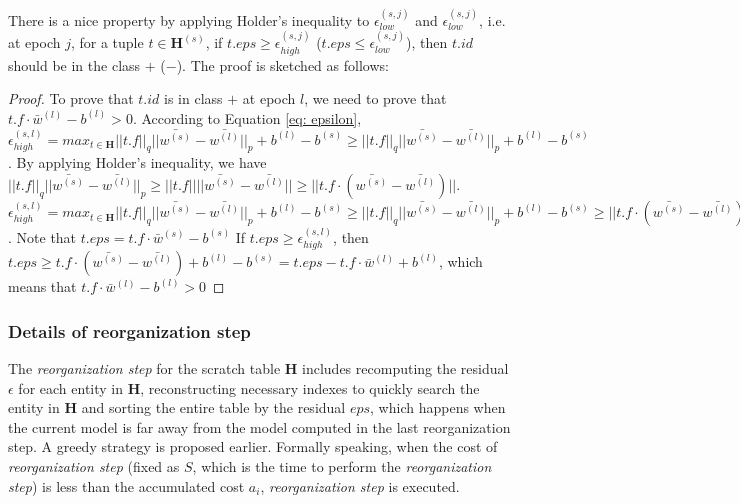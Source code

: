 There is a nice property by applying Holder's inequality \cite{rudin1976principles} to $\epsilon_{low}^{(s,j)}$ and $\epsilon_{low}^{(s,j)}$, i.e. at epoch $j$, for a tuple $t \in \textbf{H}^{(s)}$, if $t.eps \geq \epsilon_{high}^{(s,j)}$ ($t.eps \leq \epsilon_{low}^{(s,j)}$), then $t.id$ should be in the class $+$ ($-$). The proof is sketched as follows:

\begin{proof}
To prove that $t.id$ is in class $+$ at epoch $l$, we need to prove that $t.f\cdot \bar{w}^{(l)} - b^{(l)} > 0$. According to Equation \ref{eq: epsilon},
$\epsilon_{high}^{(s,l)} = max_{t \in \textbf{H}}||t.f||_q||\bar{w^{(s)}}-\bar{w^{(l)}}||_p+b^{(l)}-b^{(s)} \geq ||t.f||_q||\bar{w^{(s)}}-\bar{w^{(l)}}||_p+b^{(l)}-b^{(s)}$. By applying Holder's inequality, we have $||t.f||_q||\bar{w^{(s)}}-\bar{w^{(l)}}||_p \geq ||t.f||||\bar{w^{(s)}}-\bar{w^{(l)}}|| \geq ||t.f \cdot(\bar{w^{(s)}}-\bar{w^{(l)}})||$. $\epsilon_{high}^{(s,l)} = max_{t \in \textbf{H}}||t.f||_q||\bar{w^{(s)}}-\bar{w^{(l)}}||_p+b^{(l)}-b^{(s)} \geq ||t.f||_q||\bar{w^{(s)}}-\bar{w^{(l)}}||_p+b^{(l)}-b^{(s)} \geq ||t.f \cdot (\bar{w^{(s)}}-\bar{w^{(l)}})|| + b^{(l)}-b^{(s)} \geq t.f \cdot (\bar{w^{(s)}}-\bar{w^{(l)}}) + b^{(l)}-b^{(s)}$. Note that $t.eps = t.f \cdot \bar{w}^{(s)} - b^{(s)}$ If $t.eps \geq \epsilon_{high}^{(s,l)}$, then $t.eps \geq t.f \cdot (\bar{w^{(s)}}-\bar{w^{(l)}}) + b^{(l)}-b^{(s)} = t.eps - t.f \cdot \bar{w}^{(l)} + b^{(l)}$, which means that $t.f\cdot \bar{w}^{(l)} - b^{(l)} > 0$
\end{proof}

\subsubsection{Details of reorganization step}
The {\em reorganization step} for the scratch table $\textbf{H}$ includes recomputing the residual $\epsilon$ for each entity in $\textbf{H}$, reconstructing necessary indexes to quickly search the entity in $\textbf{H}$ and sorting the entire table by the residual $eps$, which happens when the current model is far away from the model computed in the last reorganization step. A greedy strategy is proposed earlier.  Formally speaking, when the cost of {\em reorganization step} (fixed as $S$, which is the time to perform the {\em reorganization step}) is less than the accumulated cost $a_{i}$, {\em reorganization step} is executed.

